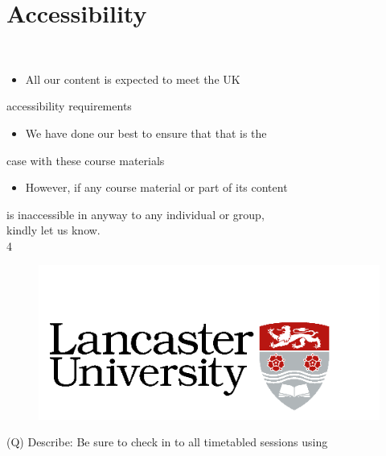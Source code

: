 \documentclass[12pt]{article}
\begin{document}
\section{Accessibility}
\\
\begin{itemize}
  \item All our content is expected to meet the UK 
\end{itemize}
accessibility requirements\\
\begin{itemize}
  \item We have done our best to ensure that that is the 
\end{itemize}
case with these course materials\\
\begin{itemize}
  \item However, if any course material or part of its content 
\end{itemize}
is inaccessible in anyway to any individual or group, \\
kindly let us know.\\
4\\
\begin{figure}[H]
\includegraphics[width=0.5\linewidth]{page1-image-1.png}
\end{figure}
\clearpage
(Q)
Describe: Be sure to check in to all timetabled sessions using 
\clearpage
\end{document}
